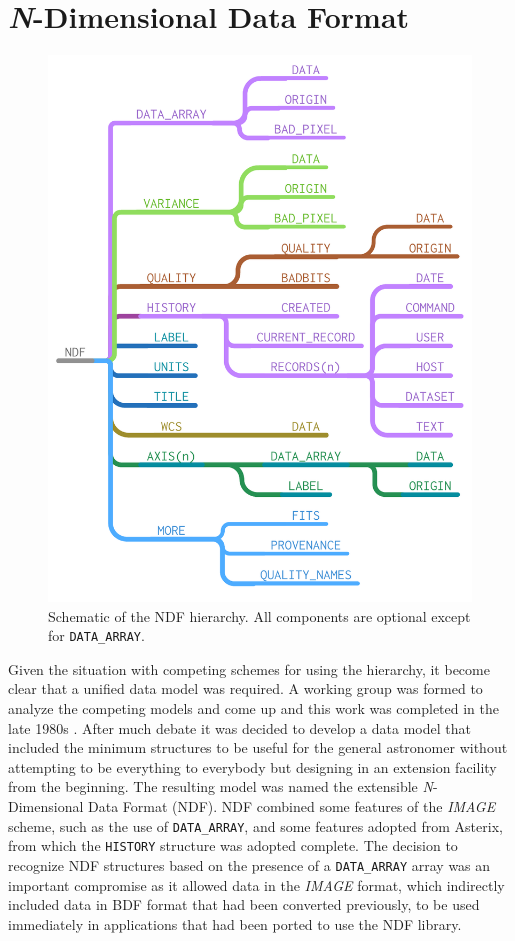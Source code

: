 \documentclass[final,authoryear,5p,times,twocolumn]{elsarticle}
\begin{document}
\section{\emph{N}-Dimensional Data Format}
\label{sec:ndf}

\begin{figure}[t]
\includegraphics[width=\columnwidth]{NDF-structure}
\caption{Schematic of the NDF hierarchy. All components are optional
  except for \texttt{DATA\_ARRAY}.}
\label{fig:ndf-structure}
\end{figure}

Given the situation with competing schemes for using the hierarchy, it
become clear that a unified data model was required. A working group
was formed to analyze the competing models and come up and this work
was completed in the late 1980s \citep{1988STARB...2...11C,SGP38}.
After much debate it was decided to develop a data model that included
the minimum structures to be useful for the general astronomer without
attempting to be everything to everybody but designing in an extension
facility from the beginning. The resulting model was named the
extensible \emph{N}-Dimensional Data Format (NDF).  NDF combined some
features of the \emph{IMAGE} scheme, such as the use of
\texttt{DATA\_ARRAY}, and some features adopted from Asterix, from
which the \texttt{HISTORY} structure was adopted complete.  The
decision to recognize NDF structures based on the presence of a
\texttt{DATA\_ARRAY} array was an important compromise as it allowed
data in the \emph{IMAGE} format, which indirectly included data in
BDF format that had been converted previously, to be used immediately
in applications that had been ported to use the NDF library.
\end{document}
